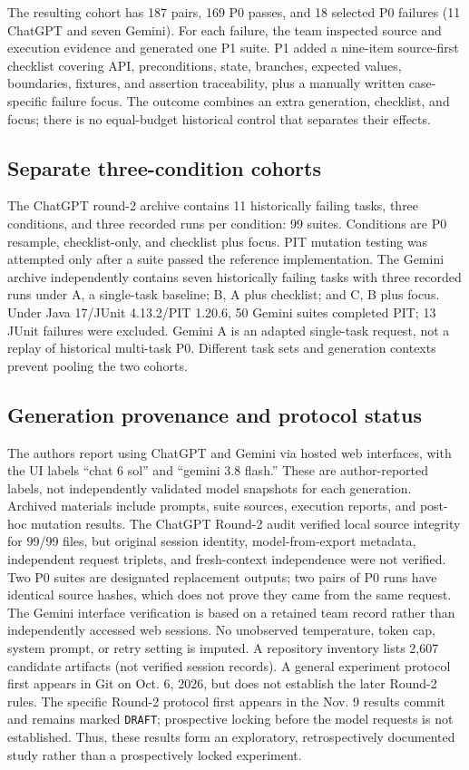 \documentclass[conference]{IEEEtran}
\begin{document}
The resulting cohort has 187 pairs, 169 P0 passes, and 18 selected P0 failures (11 ChatGPT and seven Gemini). For each failure, the team inspected source and execution evidence and generated one P1 suite. P1 added a nine-item source-first checklist covering API, preconditions, state, branches, expected values, boundaries, fixtures, and assertion traceability, plus a manually written case-specific failure focus. The outcome combines an extra generation, checklist, and focus; there is no equal-budget historical control that separates their effects.

\subsection{Separate three-condition cohorts}
The ChatGPT round-2 archive contains 11 historically failing tasks, three conditions, and three recorded runs per condition: 99 suites. Conditions are P0 resample, checklist-only, and checklist plus focus. PIT mutation testing was attempted only after a suite passed the reference implementation. The Gemini archive independently contains seven historically failing tasks with three recorded runs under A, a single-task baseline; B, A plus checklist; and C, B plus focus. Under Java 17/JUnit 4.13.2/PIT 1.20.6, 50 Gemini suites completed PIT; 13 JUnit failures were excluded. Gemini A is an adapted single-task request, not a replay of historical multi-task P0. Different task sets and generation contexts prevent pooling the two cohorts.
\subsection{Generation provenance and protocol status}
The authors report using ChatGPT and Gemini via hosted web interfaces, with the UI labels ``chat 6 sol'' and ``gemini 3.8 flash.'' These are author-reported labels, not independently validated model snapshots for each generation. Archived materials include prompts, suite sources, execution reports, and post-hoc mutation results. The ChatGPT Round-2 audit verified local source integrity for 99/99 files, but original session identity, model-from-export metadata, independent request triplets, and fresh-context independence were not verified. Two P0 suites are designated replacement outputs; two pairs of P0 runs have identical source hashes, which does not prove they came from the same request. The Gemini interface verification is based on a retained team record rather than independently accessed web sessions. No unobserved temperature, token cap, system prompt, or retry setting is imputed. A repository inventory lists 2,607 candidate artifacts (not verified session records). A general experiment protocol first appears in Git on Oct. 6, 2026, but does not establish the later Round-2 rules. The specific Round-2 protocol first appears in the Nov. 9 results commit and remains marked \texttt{DRAFT}; prospective locking before the model requests is not established. Thus, these results form an exploratory, retrospectively documented study rather than a prospectively locked experiment.
\end{document}
